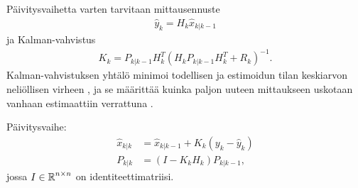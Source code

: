 Päivitysvaihetta varten tarvitaan mittausennuste
\begin{align}
    \hat{y}_k = H_k \hat{x}_{k | k-1} 
\end{align}
ja Kalman-vahvistus 
\begin{align}
    K_k = P_{k | k-1} H_k^T \left(H_k P_{k | k-1} H_k^T + R_k \right)^{-1}.
\end{align}
Kalman-vahvistuksen yhtälö minimoi todellisen ja estimoidun tilan keskiarvon neliöllisen virheen \cite{sparse_kalman_gain}, ja se määrittää kuinka paljon uuteen mittaukseen uskotaan vanhaan estimaattiin verrattuna \cite{becker2023kalman}.

Päivitysvaihe:
\begin{align}
    \hat{x}_{k | k} &= \hat{x}_{k | k-1} + K_k (y_k - \hat{y}_k)\\
    P_{k|k}         &= (I - K_k H_k)P_{k|k-1},
\end{align}
jossa \(I \in \operatorname{\mathbb{R}}^{n\times n}\) on identiteettimatriisi.


